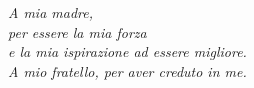 
\clearpage
\thispagestyle{empty}

\vspace*{\fill}

\begin{flushright}
	\textit{A mia madre,\\
		per essere la mia forza \\
		e la mia ispirazione ad essere migliore.\\
		A mio fratello, per aver creduto in me.}
\end{flushright}

\vspace{3cm}
\clearpage
